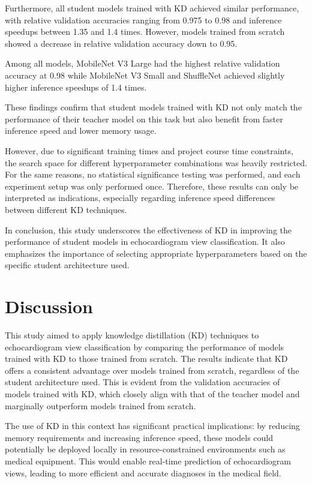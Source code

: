 \documentclass[14pt]{article}
\begin{document}
Furthermore, all student models trained with KD achieved similar performance, with relative validation accuracies ranging from 0.975 to 0.98 and inference speedups between 1.35 and 1.4 times. However, models trained from scratch showed a decrease in relative validation accuracy down to 0.95.

Among all models, MobileNet V3 Large had the highest relative validation accuracy at 0.98 while MobileNet V3 Small and ShuffleNet achieved slightly higher inference speedups of 1.4 times.

These findings confirm that student models trained with KD not only match the performance of their teacher model on this task but also benefit from faster inference speed and lower memory usage.

However, due to significant training times and project course time constraints, the search space for different hyperparameter combinations was heavily restricted. For the same reasons, no statistical significance testing was performed, and each experiment setup was only performed once. Therefore, these results can only be interpreted as indications, especially regarding inference speed differences between different KD techniques.

In conclusion, this study underscores the effectiveness of KD in improving the performance of student models in echocardiogram view classification. It also emphasizes the importance of selecting appropriate hyperparameters based on the specific student architecture used.

\section{Discussion}

This study aimed to apply knowledge distillation (KD) techniques to echocardiogram view classification by comparing the performance of models trained with KD to those trained from scratch. The results indicate that KD offers a consistent advantage over models trained from scratch, regardless of the student architecture used. This is evident from the validation accuracies of models trained with KD, which closely align with that of the teacher model and marginally outperform models trained from scratch.

The use of KD in this context has significant practical implications: by reducing memory requirements and increasing inference speed, these models could potentially be deployed locally in resource-constrained environments such as medical equipment. This would enable real-time prediction of echocardiogram views, leading to more efficient and accurate diagnoses in the medical field.
\end{document}
